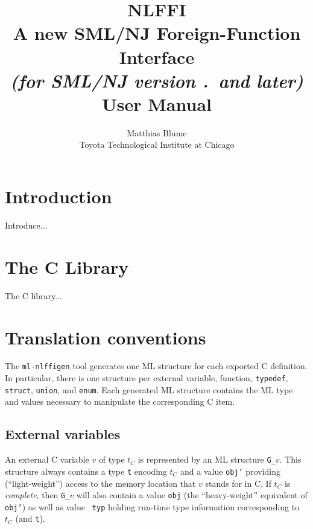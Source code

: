 \documentclass[titlepage,letterpaper]{article}
\author{Matthias Blume \\
Toyota Technological Institute at Chicago}
\title{{\bf NLFFI}\\
A new SML/NJ Foreign-Function Interface \\
{\it\small (for SML/NJ version \smlmj.\smlmn~and later)} \\
User Manual}
\newcommand{\gentool}{{\tt ml-nlffigen}}
\begin{document}


\maketitle

\pagebreak

\tableofcontents

\pagebreak

\section{Introduction}

Introduce...

\section{The C Library}

The C library...

\section{Translation conventions}

The {\gentool} tool generates one ML structure for each
exported C definition.  In particular, there is one structure per
external variable, function, {\tt typedef}, {\tt struct}, {\tt union},
and {\tt enum}.
Each generated ML structure contains the ML type and values necessary
to manipulate the corresponding C item.

\subsection{External variables}

An external C variable $v$ of type $t_C$ is represented by an ML
structure {\tt G\_}$v$.  This structure always contains a type {\tt t}
encoding $t_C$ and a value {\tt obj'} providing (``light-weight'')
access to the memory location that $v$ stands for in C.  If $t_C$ is
{\em complete}, then {\tt G\_}$v$ will also contain a value {\tt obj}
(the ``heavy-weight'' equivalent of {\tt obj'}) as well as value {\tt
  typ} holding run-time type information corresponding to $t_C$ (and
{\tt t}).
\end{document}
